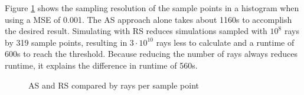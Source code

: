 Figure \ref{plot:repetitive} shows the sampling resolution
of the sample points in a histogram when using a MSE of 0.001. 
The AS approach alone takes about 1160s to accomplish the desired result. Simulating with RS reduces
simulations sampled with $10^8$ rays by 319 sample points, resulting in 
$3\cdot10^{10}$ rays less to calculate and a runtime of 600s to reach the threshold. Because reducing the number of rays always
reduces runtime, it explains the difference in runtime
of 560s.
\begin{figure}[H]
  \centerline{
    }
  \caption{AS and RS compared by rays per sample point}
  \label{plot:repetitive}
\end{figure}

